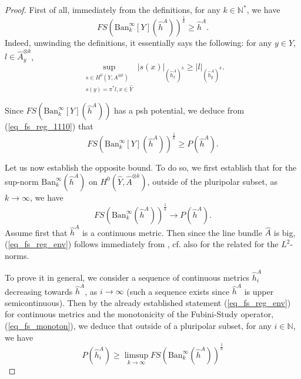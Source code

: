 \documentclass[12pt]{article}
\numberwithin{equation}{section}
\theoremstyle{theorem}
\theoremstyle{definition}
\theoremstyle{remark}
\newcommand{\nat}{\mathbb{N}}
\begin{document}
	\begin{proof}
		First of all, immediately from the definitions, for any $k \in \nat^*$, we have
		\begin{equation}\label{eq_fs_reg_1110}
			FS({\textrm{Ban}}_k^{\infty}[Y](\widehat{h}^A))^{\frac{1}{k}}
			\geq 
			\widehat{h}^A.
		\end{equation}
		Indeed, unwinding the definitions, it essentially says the following: for any $y \in \widehat{Y}$, $l \in \widehat{A}^{\otimes k}_y$, 
		\begin{equation}
			\sup_{\substack{s \in H^0(Y, A^{\otimes k}) \\ s(y) = \pi^* l, x \in \widehat{Y}}} | s(x) |_{(\widehat{h}^A_x)^k}
			\geq
			| l |_{(\widehat{h}^A_y)^k}.
		\end{equation}
		\par 
		Since $FS({\textrm{Ban}}_k^{\infty}[Y](\widehat{h}^A))$ has a psh potential, we deduce from (\ref{eq_fs_reg_1110}) that
		\begin{equation}\label{eq_fs_reg_111}
			FS({\textrm{Ban}}_k^{\infty}[Y](\widehat{h}^A))^{\frac{1}{k}}
			\geq 
			P(\widehat{h}^A).
		\end{equation} 
		\par 
		Let us now establish the opposite bound.
		To do so, we first establish that for the sup-norm ${\textrm{Ban}}_k^{\infty}(\widehat{h}^A)$ on $H^0(\widehat{Y}, \widehat{A}^{\otimes k})$, outside of the pluripolar subset, as $k \to \infty$, we have
		\begin{equation}\label{eq_fs_reg_env}
			FS({\textrm{Ban}}_k^{\infty}(\widehat{h}^A))^{\frac{1}{k}}
			\to
			P(\widehat{h}^A).
		\end{equation}
		Assume first that $\widehat{h}^A$ is a continuous metric.
		Then since the line bundle $\widehat{A}$ is big, (\ref{eq_fs_reg_env}) follows immediately from \cite[Theorem 2.16]{FinGQBig}, cf. also \cite{BermanEnvProj} for the related for the $L^2$-norms.
		\par 
		To prove it in general, we consider a sequence of continuous metrics $\widehat{h}^A_i$ decreasing towards $\widehat{h}^A$, as $i \to \infty$ (such a sequence exists since $\widehat{h}^A$ is upper semicontinuous).
		 Then by the already established statement (\ref{eq_fs_reg_env}) for continuous metrics and the monotonicity of the Fubini-Study operator, (\ref{eq_fs_monoton}), we deduce that outside of a pluripolar subset, for any $i \in \nat$, we have
		 \begin{equation}
		 	P(\widehat{h}^A_i)
		 	\geq
		 	\limsup_{k \to \infty} FS({\textrm{Ban}}_k^{\infty}(\widehat{h}^A))^{\frac{1}{k}}

\end{equation}
\end{proof}
\end{document}
